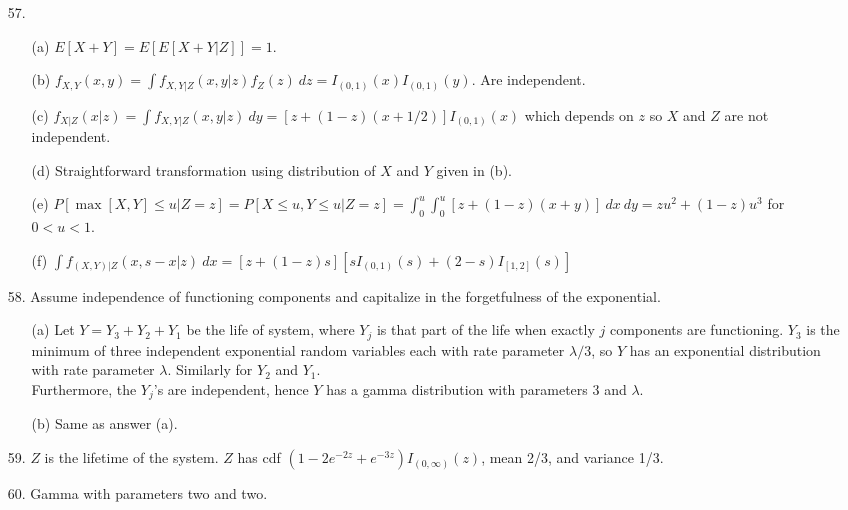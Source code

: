 \begin{enumerate}
	\item[57.] \begin{itemize}
		\item[(a)] $E[X+Y] = E[E[X+Y\vert Z]] = 1$.
		\item[(b)] $\displaystyle f_{X,Y}(x,y) = \int f_{X,Y\vert Z}(x,y\vert z)f_Z(z)\ dz =I_{(0,1)}(x)I_{(0,1)}(y)$. Are independent.
		\item[(c)] $\displaystyle f_{X\vert Z}(x\vert z) = \int f_{X,Y\vert Z}(x,y\vert z)\ dy = [z + (1-z)(x+1/2)]I_{(0,1)}(x)$ which depends on $z$ so $X$ and $Z$ are not independent.
		\item[(d)] Straightforward transformation using distribution of $X$ and $Y$ given in (b).
		\item[(e)] $\displaystyle P[\max[X,Y]\le u\vert Z=z] = P[X\le u, Y\le u\vert Z=z] = \int_{0}^{u}\int_{0}^{u}[z+(1-z)(x+y)]\ dx\ dy = zu^2+(1-z)u^3$ for $0<u<1$.
		\item[(f)] $\displaystyle \int f_{(X,Y)\vert Z}(x,s-x\vert z)\ dx = [z+(1-z)s][sI_{(0,1)}(s)+(2-s)I_{[1,2]}(s)]$ 
	\end{itemize}

	\item[58.] Assume independence of functioning components and capitalize in the forgetfulness of the exponential. 
	\begin{enumerate}
		\item[(a)] Let $Y=Y_3+Y_2+Y_1$ be the life of system, where $Y_j$ is that part of the life when exactly $j$ components are functioning. $Y_3$ is the minimum of three independent exponential random variables each with rate parameter $\lambda/3$, so $Y$ has an exponential distribution with rate parameter $\lambda$. Similarly for $Y_2$ and $Y_1$. \\


	\newpage
		Furthermore, the $Y_j$'s are independent, hence $Y$ has a gamma distribution with parameters 3 and $\lambda$.		
		
		\item[(b)] Same as answer (a).
	\end{enumerate}

	\item[59.] $Z$ is the lifetime of the system. $Z$ has cdf $(1 -2e^{-2z} + e^{-3z})I_{(0,\infty)}(z)$, mean 2/3, and variance 1/3.

	\item[60.] Gamma with parameters two and two.


\end{enumerate}
